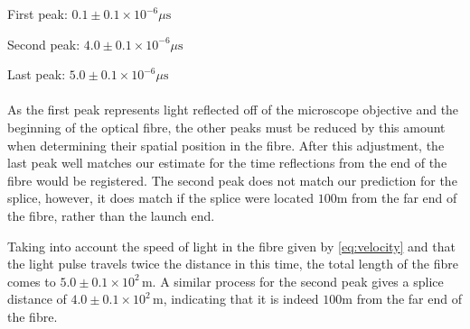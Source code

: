 First peak: $0.1 \pm 0.1 \times 10^{-6} \mu\text{s}$

Second peak: $4.0 \pm 0.1 \times 10^{-6}\mu\text{s}$

Last peak: $5.0 \pm 0.1 \times 10^{-6}\mu\text{s}$ 
\paragraph*{}
As the first peak represents light reflected off of the microscope objective and the beginning of the optical fibre, the other peaks must be reduced by this amount when determining their spatial position in the fibre.
After this adjustment, the last peak well matches our estimate for the time reflections from the end of the fibre would be registered.
The second peak does not match our prediction for the splice, 
however, it does match if the splice were located $100$m from the far end of the fibre, rather than the launch end.

Taking into account the speed of light in the fibre given by \eqref{eq:velocity} and that the light pulse travels twice the distance in this time,
the total length of the fibre comes to $5.0 \pm 0.1 \times 10^{2} \,\text{m}$.
A similar process for the second peak gives a splice distance of
$4.0 \pm 0.1 \times 10^{2} \,\text{m}$, indicating that it is indeed $100$m from the far end of the fibre.

